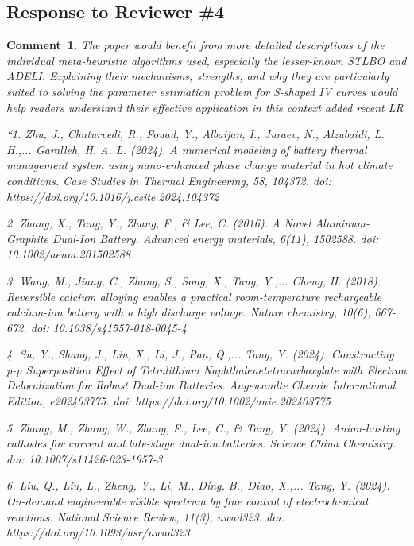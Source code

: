 \documentclass[a4paper,fleqn]{cas-sc}
\begin{document}
\vspace{1cm}
\subsection*{Response to Reviewer \#4 }


\noindent
\textcolor[rgb]{0.00,0.50,1.00}{\textbf{Comment~1.}}
\emph{The paper would benefit from more detailed descriptions of the individual meta-heuristic algorithms used,
especially the lesser-known STLBO and ADELI.
Explaining their mechanisms, strengths, and why they are particularly suited to solving the parameter estimation problem
for S-shaped IV curves would help readers understand their effective application in this
context added recent LR}

\emph{
``1. Zhu, J., Chaturvedi, R., Fouad, Y., Albaijan, I., Juraev, N., Alzubaidi, L. H.,... Garalleh, H. A. L. (2024).
A numerical modeling of battery thermal management system using nano-enhanced phase
change material in hot climate conditions. Case Studies in Thermal Engineering, 58, 104372.
doi: https://doi.org/10.1016/j.csite.2024.104372
}

\emph{
2. Zhang, X., Tang, Y., Zhang, F., \& Lee, C. (2016).
A Novel Aluminum-Graphite Dual-Ion Battery. Advanced energy materials, 6(11), 1502588.
doi: 10.1002/aenm.201502588
}

\emph{
3. Wang, M., Jiang, C., Zhang, S., Song, X., Tang, Y.,... Cheng, H. (2018).
Reversible calcium alloying enables a practical room-temperature rechargeable
calcium-ion battery with a high discharge voltage. Nature chemistry, 10(6), 667-672.
doi: 10.1038/s41557-018-0045-4
}

\emph{
4. Su, Y., Shang, J., Liu, X., Li, J., Pan, Q.,... Tang, Y. (2024).
Constructing p-p Superposition Effect of Tetralithium Naphthalenetetracarboxylate
with Electron Delocalization for Robust Dual-ion Batteries.
Angewandte Chemie International Edition, e202403775.
doi: https://doi.org/10.1002/anie.202403775
}

\emph{
5. Zhang, M., Zhang, W., Zhang, F., Lee, C., \& Tang, Y. (2024).
Anion-hosting cathodes for current and late-stage dual-ion batteries.
Science China Chemistry.
doi: 10.1007/s11426-023-1957-3
}

\emph{
6. Liu, Q., Liu, L., Zheng, Y., Li, M., Ding, B., Diao, X.,... Tang, Y. (2024).
On-demand engineerable visible spectrum by fine control of electrochemical reactions.
National Science Review, 11(3), nwad323.
doi: https://doi.org/10.1093/nsr/nwad323
}
\end{document}
